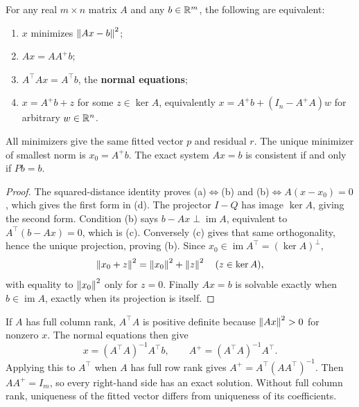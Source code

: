 \begin{theorem}
For any real \(m\times n\) matrix \(A\) and any \(b\in\mathbb R^m\),
the following are equivalent:
\begin{enumerate}
\item \(x\) minimizes \(\left\lVert Ax-b\right\rVert^2\);
\item \(Ax=AA^+b\);
\item \(A^\top Ax=A^\top b\), the \textbf{normal equations};
\item \(x=A^+b+z\) for some \(z\in\ker A\), equivalently
\(x=A^+b+(I_n-A^+A)w\) for arbitrary \(w\in\mathbb R^n\).
\end{enumerate}
All minimizers give the same fitted vector \(p\) and residual \(r\).
The unique minimizer of smallest norm is \(x_0=A^+b\).
The exact system \(Ax=b\) is consistent if and only if \(Pb=b\).
\end{theorem}
\begin{proof}
The squared-distance identity proves (a)\(\Leftrightarrow\)(b) and
(b)\(\Leftrightarrow\)\(A(x-x_0)=0\), which gives the first form in (d).
The projector \(I-Q\) has image \(\ker A\), giving the second form.
Condition (b) says \(b-Ax\perp\operatorname{im}A\), equivalent to
\(A^\top(b-Ax)=0\), which is (c). Conversely (c) gives that same
orthogonality, hence the unique projection, proving (b).
Since \(x_0\in\operatorname{im}A^\top=(\ker A)^\perp\),
\[
\left\lVert x_0+z\right\rVert^2=\left\lVert x_0\right\rVert^2+\left\lVert z\right\rVert^2\quad(z\in\ker A),
\]
with equality to \(\left\lVert x_0\right\rVert^2\) only for \(z=0\).
Finally \(Ax=b\) is solvable exactly when \(b\in\operatorname{im}A\),
exactly when its projection is itself.
\end{proof}

If \(A\) has full column rank, \(A^\top A\) is positive definite because
\(\left\lVert Ax\right\rVert^2>0\) for nonzero \(x\). The normal equations then give
\[
x=(A^\top A)^{-1}A^\top b,\qquad A^+=(A^\top A)^{-1}A^\top.
\]
Applying this to \(A^\top\) when \(A\) has full row rank gives
\(A^+=A^\top(AA^\top)^{-1}\). Then \(AA^+=I_m\), so every right-hand
side has an exact solution. Without full column rank, uniqueness of the
fitted vector differs from uniqueness of its coefficients.

